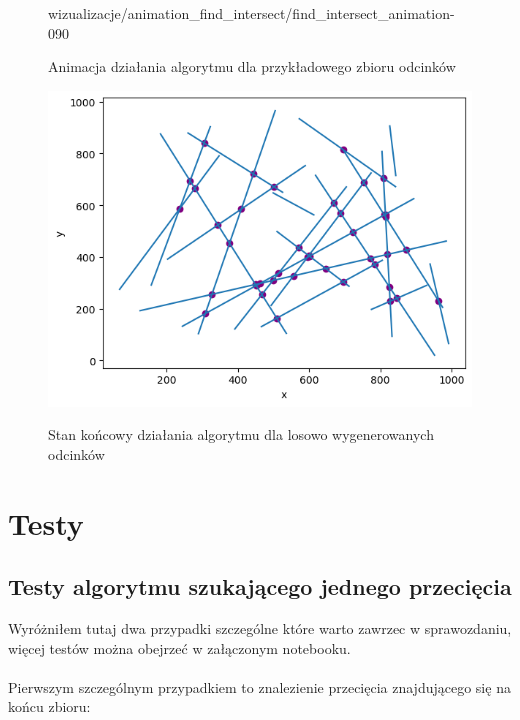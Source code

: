 \documentclass[a4paper]{article}
\begin{document}
\begin{figure}[H]
    \centering
    {wizualizacje/animation_find_intersect/find_intersect_animation-}{0}{90}
    \caption{Animacja działania algorytmu dla przykładowego zbioru odcinków}
    \label{fig:find_intersect_animation}
\end{figure}

\begin{figure}[H]
    \centering
    \includegraphics[width=.8\textwidth]{wizualizacje/find_intersect_random.png}
    \label{fig:find_intersect_res_random}
    \caption{Stan końcowy działania algorytmu dla losowo wygenerowanych odcinków}
\end{figure}

\section{Testy}
\subsection{Testy algorytmu szukającego jednego przecięcia}
Wyróżniłem tutaj dwa przypadki szczególne które warto zawrzec w sprawozdaniu, więcej testów
można obejrzeć w załączonym notebooku.\\\\
Pierwszym szczególnym przypadkiem to znalezienie przecięcia znajdującego się na końcu zbioru:\\
\end{document}
